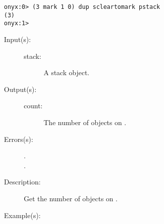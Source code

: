 \begin{description}
\begin{description}
\begin{verbatim}
onyx:0> (3 mark 1 0) dup scleartomark pstack
(3)
onyx:1>
		\end{verbatim}
	\end{description}
\label{systemdict:scount}
\item[{\onyxop{stack}{scount}{count}}: ]
	\begin{description}\item[]
	\item[Input(s): ]
		\begin{description}\item[]
		\item[stack: ]
			A stack object.
		\end{description}
	\item[Output(s): ]
		\begin{description}\item[]
		\item[count: ]
			The number of objects on .
		\end{description}
	\item[Errors(s): ]
		\begin{description}\item[]
		\item[.]
		\item[.]
		\end{description}
	\item[Description: ]
		Get the number of objects on .
	\item[Example(s): ]\begin{verbatim}


\end{verbatim}
\end{description}
\end{description}
